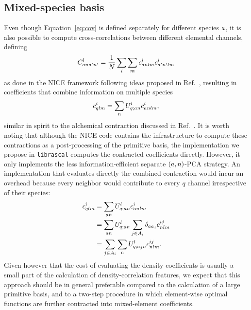 
\subsection{Mixed-species basis}

Even though Equation~\eqref{eq:cov} is defined separately for different species $a$, it is also possible to compute cross-correlations between different elemental channels, defining
\begin{equation}
  C^{l}_{a na' n'}= \frac{1}{N} \sum_i \sum_m c^i_{a nlm}c^i_{a^\prime n^\prime lm} 
\label{eq:cov-multispecies}
\end{equation}
as done in the NICE framework\cite{niga+20jcp} following ideas proposed in Ref.~, resulting in coefficients that combine information on multiple species
\begin{equation}
  c^i_{qlm} = \sum_n U^{l}_{q;a n} c^i_{a nlm}, \label{eq:contract-multispecies}
\end{equation}
similar in spirit to the alchemical contraction discussed in Ref.~.
It is worth noting that although the NICE code\cite{NICE-REPO} contains the infrastructure to compute these contractions as a post-processing of the primitive basis, the implementation we propose in \texttt{librascal}\cite{LIBRASCAL} computes the contracted coefficients directly. However, it only implements the less information-efficient separate $(a, n)$-PCA strategy.
An implementation that evaluates directly the combined contraction would incur an overhead because every neighbor would contribute to every $q$ channel irrespective of their species:
\begin{align}
  c^i_{qlm}  &= \sum_{a n} U^l_{q; a n} c^{i}_{a nlm} \\
             &= \sum_{a n} U^l_{q; a n} \sum_{j\in A_i} \delta_{a a_j} c^{ij}_{nlm} \\
             &= \sum_{j\in A_i} \sum_{n} U^l_{q; a_j n} c^{ij}_{nlm}.
\end{align}
Given however that the cost of evaluating the density coefficients is usually a small part of the calculation of density-correlation features\cite{caro2019optimizing,musil2021efficient}, we expect that this approach should be in general preferable compared to the calculation of a large primitive basis, and to a two-step procedure in which element-wise optimal functions are further contracted into mixed-element coefficients.

